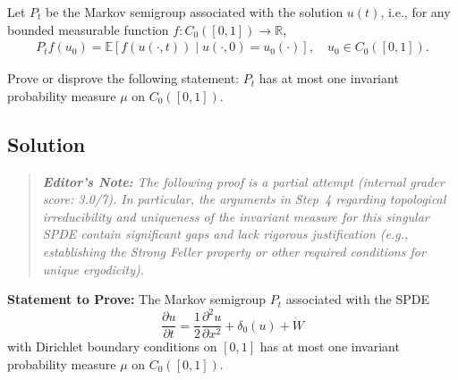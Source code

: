 \documentclass[12pt]{article}
\newcommand{\R}{\mathbb{R}}
\begin{document}
Let $P_t$ be the Markov semigroup associated with the solution $u(t)$, i.e., for any bounded measurable function $f\colon C_0([0,1])\to\R$,
\begin{align}
    P_t f(u_0) = \mathbb{E}[f(u(\cdot,t)) \mid u(\cdot,0) = u_0(\cdot)],\quad u_0\in C_0([0,1]).
\end{align}

Prove or disprove the following statement:  $P_t$ has at most one invariant probability measure $\mu$ on $C_0([0,1])$.

\subsection*{Solution}

\begin{quote}
\small \emph{\textbf{Editor's Note:} The following proof is a partial attempt (internal grader score: 3.0/7). In particular, the arguments in Step~4 regarding topological irreducibility and uniqueness of the invariant measure for this singular SPDE contain significant gaps and lack rigorous justification (e.g., establishing the Strong Feller property or other required conditions for unique ergodicity).}
\end{quote}

\noindent\textbf{Statement to Prove:} The Markov semigroup $P_t$ associated with the SPDE 
\[ \frac{\partial u}{\partial t} = \frac{1}{2} \frac{\partial^2 u}{\partial x^2} + \delta_0(u) +  \dot{W} \]
with Dirichlet boundary conditions on $[0,1]$ has at most one invariant probability measure $\mu$ on $C_0([0,1])$.
\end{document}
